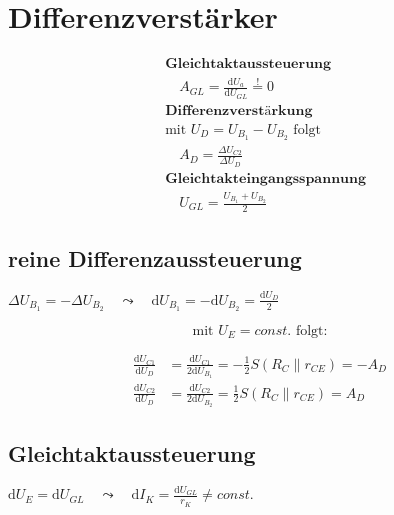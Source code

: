 \newpage
\section*{Differenzverstärker}

\begin{multicols}{2}

	\begin{center}
		
	\end{center}

	\begin{align*}
		&\textbf{Gleichtaktaussteuerung}
		\\
		&\quad A_{GL} = \frac{\mathrm{d} U_a}{\mathrm{d} U_{GL}} \stackrel{!}{=} 0
		\\
		&\textbf{Differenzverstärkung}
		\\
		&\text{mit } U_D = U_{B_1} - U_{B_2} \text{ folgt}
		\\
		&\quad A_D = \frac{\Delta U_{C2}}{\Delta U_D}
		\\
		&\textbf{Gleichtakteingangsspannung}
		\\
		&\quad U_{GL} = \frac{U_{B_1} + U_{B_2}}{2}
	\end{align*}

\end{multicols}

\subsection*{reine Differenzaussteuerung}
\( 
\Delta U_{B_1} = -\Delta U_{B_2} \quad \leadsto \quad \mathrm{d} U_{B_1} = -\mathrm{d} U_{B_2} =
\frac{\mathrm{d}U_D}{2}
\)

\[
\text{mit } U_E = const. \text{ folgt:}
\]

\begin{align*}
	\frac{\mathrm{d} U_{C1}}{\mathrm{d} U_D} &= \frac{\mathrm{d} U_{C1}}{2 \mathrm{d} U_{B_1}} =
	-\frac{1}{2} S \left( R_C \parallel r_{CE} \right) = -A_D
	\\
	\frac{\mathrm{d} U_{C2}}{\mathrm{d} U_D} &= \frac{\mathrm{d} U_{C2}}{2 \mathrm{d} U_{B_2}} =
	\frac{1}{2} S \left( R_C \parallel r_{CE} \right) = A_D
\end{align*}

\newpage
\subsection*{Gleichtaktaussteuerung}
\(
\mathrm{d} U_E = \mathrm{d} U_{GL} \quad \leadsto \quad \mathrm{d} I_K = \frac{\mathrm{d}
U_{GL}}{r_K} \neq const.
\)

